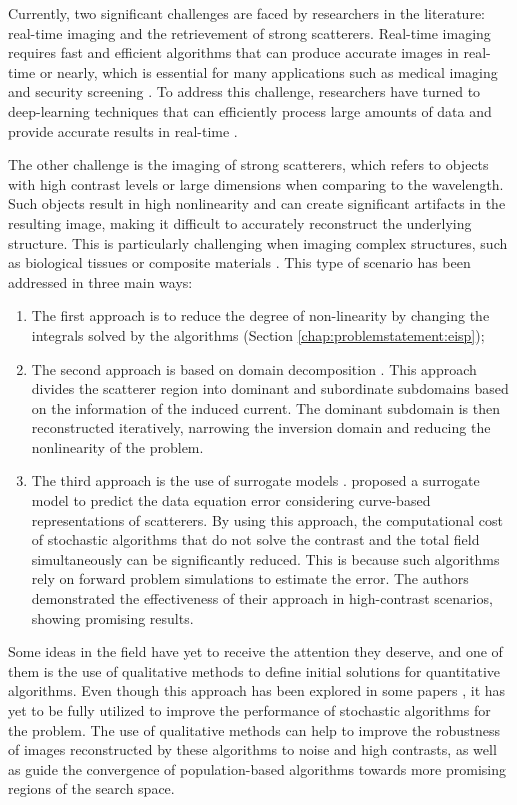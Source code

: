 		Currently, two significant challenges are faced by researchers in the literature: real-time imaging and the retrievement of strong scatterers. Real-time imaging requires fast and efficient algorithms that can produce accurate images in real-time or nearly, which is essential for many applications such as medical imaging \citep{li2021machine} and security screening \citep{asok2022concealed}. To address this challenge, researchers have turned to deep-learning techniques that can efficiently process large amounts of data and provide accurate results in real-time \citep{salucci2022artificial}.
		
		The other challenge is the imaging of strong scatterers, which refers to objects with high contrast levels or large dimensions when comparing to the wavelength. Such objects result in high nonlinearity and can create significant artifacts in the resulting image, making it difficult to accurately reconstruct the underlying structure. This is particularly challenging when imaging complex structures, such as biological tissues or composite materials \citep{lazebnik2007large}. This type of scenario has been addressed in three main ways:
		\begin{enumerate}
			\item The first approach is to reduce the degree of non-linearity by changing the integrals solved by the algorithms (Section \ref{chap:problemstatement:eisp});
			\item The second approach is based on domain decomposition \citep{zhang2022iterative}. This approach divides the scatterer region into dominant and subordinate subdomains based on the information of the induced current. The dominant subdomain is then reconstructed iteratively, narrowing the inversion domain and reducing the nonlinearity of the problem.
			\item The third approach is the use of surrogate models \citep{koziel2008engineering}. \cite{salucci2022learned} proposed a surrogate model to predict the data equation error considering curve-based representations of scatterers. By using this approach, the computational cost of stochastic algorithms that do not solve the contrast and the total field simultaneously can be significantly reduced. This is because such algorithms rely on forward problem simulations to estimate the error. The authors demonstrated the effectiveness of their approach in high-contrast scenarios, showing promising results.
		\end{enumerate}
		
		Some ideas in the field have yet to receive the attention they deserve, and one of them is the use of qualitative methods to define initial solutions for quantitative algorithms. Even though this approach has been explored in some papers \citep{zhang2020learning,han2022hybrid,bevacqua2015algebraic}, it has yet to be fully utilized to improve the performance of stochastic algorithms for the problem. The use of qualitative methods can help to improve the robustness of images reconstructed by these algorithms to noise and high contrasts, as well as guide the convergence of population-based algorithms towards more promising regions of the search space.
		
